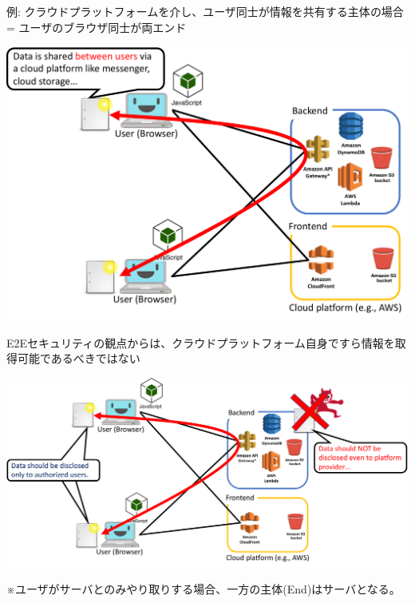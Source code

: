 \documentclass[12pt,dvipdfmx]{beamer}
\begin{document}
\begin{frame}
例: クラウドプラットフォームを介し、\alert{ユーザ同士が情報を共有する主体}の場合 = ユーザのブラウザ同士が両エンド
\begin{center}
\includegraphics[width=0.8\linewidth]{Figs/e2e1.pdf}
\end{center}
\end{frame}

\begin{frame}
E2Eセキュリティの観点からは、\alert{クラウドプラットフォーム自身ですら情報を取得可能であるべきではない}
\begin{center}
\includegraphics[width=\linewidth]{Figs/e2e2.pdf}
\end{center}
{\footnotesize ※ユーザがサーバとのみやり取りする場合、一方の主体(End)はサーバとなる。}
\end{frame}
\end{document}
